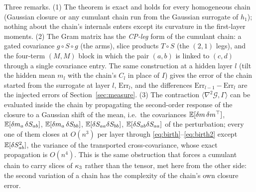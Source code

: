 Three remarks. (1) The theorem is exact and holds for every homogeneous chain (Gaussian closure or any cumulant
chain run from the Gaussian surrogate of $h_1$); nothing about the chain's internals enters except its curvature
in the first-layer moments. (2) The Gram matrix has the \emph{CP-leg} form of the cumulant chain: a gated
covariance $g\circ S\circ g$ (the arms), slice products $T\circ S$ (the $(2,1)$ legs), and the four-term
$(M,M)$ block in which the pair $(a,b)$ is linked to $(c,d)$ through a single covariance entry. The same
construction at a hidden layer $l$ (tilt the hidden mean $m_l$ with the chain's $C_l$ in place of $I$) gives the
error of the chain started from the surrogate at layer $l$, $\mathrm{Err}_l$, and the differences
$\mathrm{Err}_{l-1}-\mathrm{Err}_l$ are the injected errors of Section~\ref{sec:measure}. (3) The contraction
$\langle\nabla^2\mathcal G,\Gamma\rangle$ can be evaluated inside the chain by propagating the second-order
response of the closure to a Gaussian shift of the mean, i.e.\ the covariances $\mathbb E[\delta m\,\delta m^\top]$,
$\mathbb E[\delta m_a\,\delta S_{ab}]$, $\mathbb E[\delta m_a\,\delta S_{bb}]$, $\mathbb E[\delta S_{aa}\delta S_{bb}]$,
$\mathbb E[\delta S_{ab}\delta S_{aa}]$ of the perturbation; every one of them closes at $O(n^3)$ per layer through
\eqref{eq:birth}--\eqref{eq:birth2} except $\mathbb E[\delta S_{ab}^2]$, the variance of the transported
cross-covariance, whose exact propagation is $O(n^4)$. This is the same obstruction that forces a cumulant chain
to carry slices of $\kappa_3$ rather than the tensor, met here from the other side: the second variation of a
chain has the complexity of the chain's own closure error.

